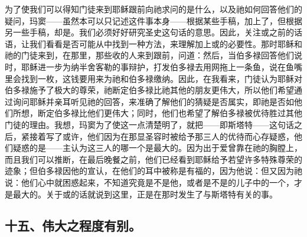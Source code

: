   为了使我们可以得知门徒来到耶稣跟前向祂求问的是什么，以及祂如何回答他们的疑问，玛窦——虽然本可以只记述这件事本身——根据某些手稿，加上了，但根据另一些手稿，却是。我们必须好好研究圣史这句话的意思。因此，关注或之前的话语，让我们看看是否可能从中找到一种方法，来理解加上或的必要性。那时耶稣和祂的门徒来到，在那里，那些收的人来到跟前，问道：然后，当伯多禄回答他们说时，耶稣进一步为纳半舍客勒的事辩护，打发伯多禄去用网拖上一条鱼，说在鱼嘴里会找到一枚，这钱要用来为祂和伯多禄缴纳。因此，在我看来，门徒认为耶稣对伯多禄施予了极大的尊荣，祂断定伯多禄比祂其他的朋友更伟大，所以他们希望通过询问耶稣并亲耳听见祂的回答，来准确了解他们的猜疑是否属实，即祂是否如他们所想，断定伯多禄比他们更伟大；同时，他们也希望了解伯多禄被优待胜过其他门徒的理由。我想，玛窦为了使这一点清楚明了，就把——即斯塔特——这句话之后，紧接着写了或许，他们因为在那显圣容时被给予那三人的优待而心存疑惑，他们疑惑的是——主认为这三人的哪一个是最大的。因为出于爱曾靠在祂的胸膛上，而且我们可以推断，在最后晚餐之前，他们已经看到耶稣给予若望许多特殊尊荣的迹象；但伯多禄因他的宣认，在他们的耳中被称是有福的，因为他说：但又因为祂说：他们心中就困惑起来，不知道究竟是不是他，或者是不是的儿子中的一个，才是最大的。关于或的话就说到这里，正是在那时发生了与斯塔特有关的事。\par


\subsection{十五、伟大之程度有别。}

